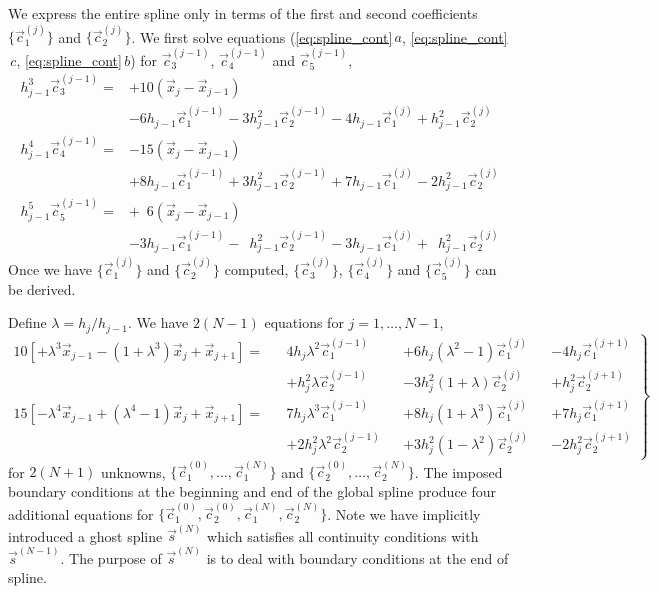 \documentclass{jfm}
\begin{document}
We express the entire spline only in terms of the first and second coefficients 
$\{\vec{c}^{(j)}_1\}$ and $\{\vec{c}^{(j)}_2\}$.
We first solve equations 
(\ref{eq:spline_cont}$\,a$, \ref{eq:spline_cont}$\,c$, \ref{eq:spline_cont}$\,b$) for $\vec{c}^{(j-1)}_3$,
 $\vec{c}^{(j-1)}_4$ and $\vec{c}^{(j-1)}_5$,
\begin{subequations}\label{eq:spline_c3c4c5}
\begin{align}
\nonumber h^3_{j-1}\vec{c}^{(j-1)}_3=&+10( \vec{x}_j- \vec{x}_{j-1})\\
&-6 h_{j-1} \vec{c}_1^{(j-1)}
-3 h_{j-1}^2 \vec{c}_2^{(j-1)}
-4 h_{j-1} \vec{c}_1^{(j)}
+h_{j-1}^2 \vec{c}_2^{(j)}\\
\nonumber h^4_{j-1}\vec{c}^{(j-1)}_4=&-15 (\vec{x}_j- \vec{x}_{j-1})\\
&+8 h_{j-1} \vec{c}_1^{(j-1)}
+3 h_{j-1}^2 \vec{c}_2^{(j-1)}
+7 h_{j-1} \vec{c}_1^{(j)}
-2 h_{j-1}^2 \vec{c}_2^{(j)}\\
\nonumber h^5_{j-1}\vec{c}^{(j-1)}_5=&+\phantom{1}6( \vec{x}_j- \vec{x}_{j-1})\\
&-3 h_{j-1} \vec{c}_1^{(j-1)}
-\phantom{1}h_{j-1}^2 \vec{c}_2^{(j-1)}
-3 h_{j-1} \vec{c}_1^{(j)}
+\phantom{1}h_{j-1}^2 \vec{c}_2^{(j)}
\end{align}
\end{subequations}
Once we have $\{\vec{c}^{(j)}_1\}$ and $\{\vec{c}^{(j)}_2\}$ computed,
$\{\vec{c}^{(j)}_3\}$, $\{\vec{c}^{(j)}_4\}$ and $\{\vec{c}^{(j)}_5\}$
can be derived.



Define $\lambda=h_j/h_{j-1}$. We have $2(N-1)$ equations for $j=1,\dots, N-1$,
\begin{equation}\label{eq:spline_mid}
\left.\begin{aligned}
10\left[+ \lambda^3 \vec{x}_{j-1}- (1+\lambda^3) \vec{x}_j+\vec{x}_{j+1}\right]=
&&4 h_{j} \lambda^2 \vec{c}_1^{(j-1)}
&&+6 h_{j} (\lambda^2-1) \vec{c}_1^{(j)}
&&-4 h_{j} \vec{c}_1^{(j+1)}\\
&&+h_{j}^2 \lambda \vec{c}_2^{(j-1)}
&&-3 h_{j}^2 (1+\lambda) \vec{c}_2^{(j)}
&&+h_{j}^2 \vec{c}_2^{(j+1)}
\\
15 \left[- \lambda^4 \vec{x}_{j-1}+ (\lambda^4-1) \vec{x}_j+\vec{x}_{j+1}\right]=
&&7 h_{j} \lambda^3 \vec{c}_1^{(j-1)}
&&+8 h_{j} (1+\lambda^3) \vec{c}_1^{(j)}
&&+7 h_{j} \vec{c}_1^{(j+1)}\\
&&+2 h_{j}^2 \lambda^2 \vec{c}_2^{(j-1)}
&&+3h_{j}^2 (1- \lambda^2) \vec{c}_2^{(j)}
&&-2 h_{j}^2 \vec{c}_2^{(j+1)}
\end{aligned}\right\}
\end{equation}
for $2(N+1)$ unknowns,
 $\{\vec{c}_1^{(0)},\dots,\vec{c}_1^{(N)}\}$ and  $\{\vec{c}_2^{(0)},\dots,\vec{c}_2^{(N)}\}$.
The imposed boundary conditions at the beginning and end of the global spline
produce four additional equations for
$\{\vec{c}_1^{(0)}, \vec{c}_2^{(0)},\vec{c}_1^{(N)}, \vec{c}_2^{(N)}\}$.
Note we have implicitly introduced a ghost spline $\vec{s}^{(N)}$
which satisfies all continuity conditions with $\vec{s}^{(N-1)}$.
The purpose of $\vec{s}^{(N)}$ is to deal with boundary conditions at the end of spline.
\end{document}

